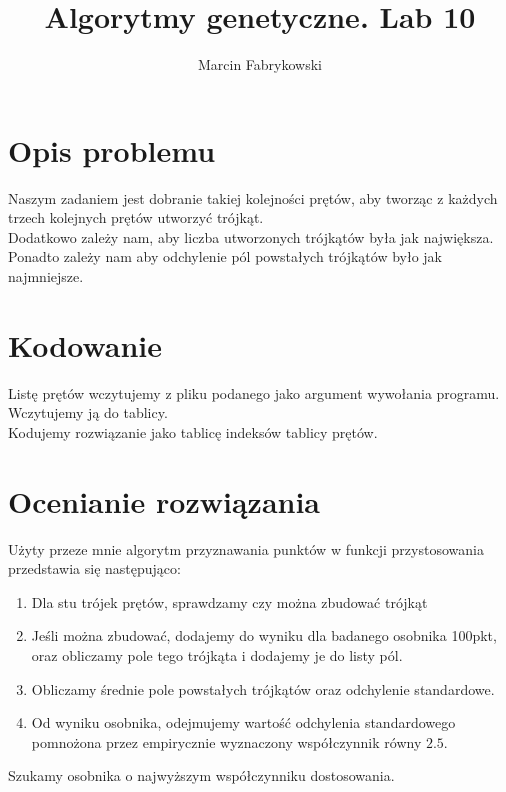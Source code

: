 \documentclass[a4paper,12pt]{article}
\author{Marcin Fabrykowski}
\title{Algorytmy genetyczne. Lab 10}
\date{}
\begin{document}
\maketitle
\newpage
\section{Opis problemu}
Naszym zadaniem jest dobranie takiej kolejności prętów, aby tworząc z każdych trzech kolejnych prętów utworzyć trójkąt.\\
Dodatkowo zależy nam, aby liczba utworzonych trójkątów była jak największa. Ponadto zależy nam aby odchylenie pól powstałych trójkątów było jak najmniejsze.
\section{Kodowanie}
Listę prętów wczytujemy z pliku podanego jako argument wywołania programu. Wczytujemy ją do tablicy.\\
Kodujemy rozwiązanie jako tablicę indeksów tablicy prętów.
\section{Ocenianie rozwiązania}
Użyty przeze mnie algorytm przyznawania punktów w funkcji przystosowania przedstawia się następująco:
\begin{enumerate}
\item Dla stu trójek prętów, sprawdzamy czy można zbudować trójkąt
\item Jeśli można zbudować, dodajemy do wyniku dla badanego osobnika 100pkt, oraz obliczamy pole tego trójkąta i dodajemy je do listy pól.
\item Obliczamy średnie pole powstałych trójkątów oraz odchylenie standardowe.
\item Od wyniku osobnika, odejmujemy wartość odchylenia standardowego pomnożona przez empirycznie wyznaczony współczynnik równy $2.5$.
\end{enumerate}
Szukamy osobnika o najwyższym współczynniku dostosowania.
\end{document}
